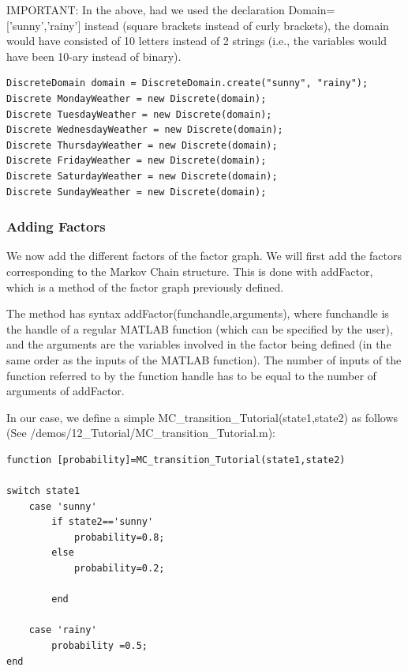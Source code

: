 IMPORTANT: In the above, had we used the declaration Domain=['sunny','rainy'] instead (square brackets instead of curly brackets), the domain would have consisted of 10 letters instead of 2 strings (i.e., the variables would have been 10-ary instead of binary).

\fi

\ifjava

\begin{lstlisting}
DiscreteDomain domain = DiscreteDomain.create("sunny", "rainy");
Discrete MondayWeather = new Discrete(domain);
Discrete TuesdayWeather = new Discrete(domain);
Discrete WednesdayWeather = new Discrete(domain);
Discrete ThursdayWeather = new Discrete(domain);
Discrete FridayWeather = new Discrete(domain);
Discrete SaturdayWeather = new Discrete(domain);
Discrete SundayWeather = new Discrete(domain);
\end{lstlisting}

\fi

\subsubsection*{Adding Factors}

We now add the different factors of the factor graph. We will first add the factors corresponding to the Markov Chain structure. This is done with addFactor, which is a method of the factor graph previously defined. 

\ifmatlab

The method has syntax addFactor(funchandle,arguments), where funchandle is the handle of a regular MATLAB function (which can be specified by the user), and the arguments are the variables involved in the factor being defined (in the same order as the inputs of the MATLAB function). The number of inputs of the function referred to by the function handle has to be equal to the number of arguments of addFactor.


In our case, we define a simple MC\_transition\_Tutorial(state1,state2) as follows (See /demos/12\_Tutorial/MC\_transition\_Tutorial.m):


\begin{lstlisting}
function [probability]=MC_transition_Tutorial(state1,state2)
 
switch state1
    case 'sunny'
        if state2=='sunny'
            probability=0.8;
        else
            probability=0.2;
            
        end
        
    case 'rainy'
        probability =0.5;
end 
\end{lstlisting}

